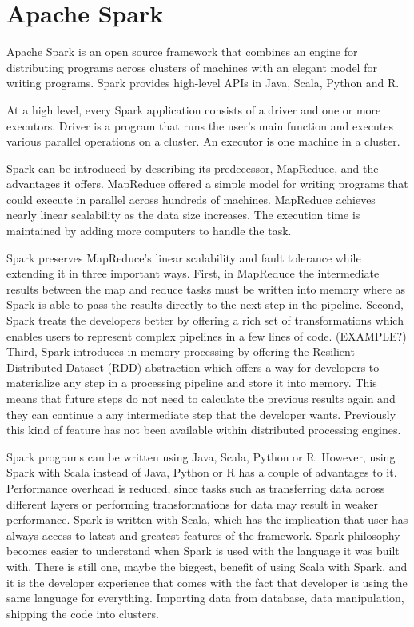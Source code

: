 \documentclass[main.tex]{thesis.tex}
\begin{document}
\chapter{Apache Spark}

Apache Spark is an open source framework that combines an engine for distributing programs across clusters of machines with an elegant model for writing programs. \cite{ryza15}
Spark provides high-level APIs in Java, Scala, Python and R.

At a high level, every Spark application consists of a driver and one or more executors.
Driver is a program that runs the user's main function and executes various parallel operations on a cluster.
An executor is one machine in a cluster.

Spark can be introduced by describing its predecessor, MapReduce, and the advantages it offers.
MapReduce offered a simple model for writing programs that could execute in parallel across hundreds of machines.
MapReduce achieves nearly linear scalability as the data size increases.
The execution time is maintained by adding more computers to handle the task.

Spark preserves MapReduce's linear scalability and fault tolerance while extending it in three important ways.
First, in MapReduce the intermediate results between the map and reduce tasks must be written into memory where as Spark is able to pass the results directly to the next step in the pipeline.
Second, Spark treats the developers better by offering a rich set of transformations which enables users to represent complex pipelines in a few lines of code. (EXAMPLE?)
Third, Spark introduces in-memory processing by offering the Resilient Distributed Dataset (RDD) abstraction which offers a way for developers to materialize any step in a processing pipeline and store it into memory.
This means that future steps do not need to calculate the previous results again and they can continue a any intermediate step that the developer wants.
Previously this kind of feature has not been available within distributed processing engines. \cite{ryza15}

Spark programs can be written using Java, Scala, Python or R.
However, using Spark with Scala instead of Java, Python or R has a couple of advantages to it.
Performance overhead is reduced, since tasks such as transferring data across different layers or performing transformations for data may result in weaker performance.
Spark is written with Scala, which  has the implication that user has always access to latest and greatest features of the framework.
Spark philosophy becomes easier to understand when Spark is used with the language it was built with.
There is still one, maybe the biggest, benefit of using Scala with Spark, and it is the developer experience that comes with the fact that developer is using the same language for everything.
Importing data from database, data manipulation, shipping the code into clusters. \cite{ryza15}
\end{document}
